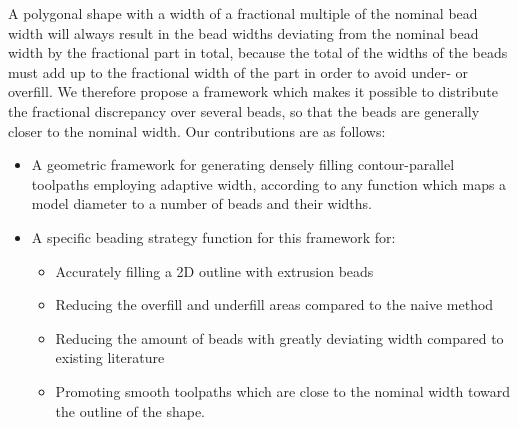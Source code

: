 A polygonal shape with a width of a fractional multiple of the nominal bead width will always result in the bead widths deviating from the nominal bead width by the fractional part in total,
because the total of the widths of the beads must add up to the fractional width of the part in order to avoid under- or overfill.
We therefore propose a framework which makes it possible to distribute the fractional discrepancy over several beads, so that the beads are generally closer to the nominal width.
Our contributions are as follows:
\begin{itemize}
\item A geometric framework for generating densely filling contour-parallel toolpaths employing adaptive width, according to any function which maps a model diameter to a number of beads and their widths.
\item A specific beading strategy function for this framework for:
\begin{itemize}
\item Accurately filling a 2D outline with extrusion beads
\item Reducing the overfill and underfill areas compared to the naive method
\item Reducing the amount of beads with greatly deviating width compared to existing literature
\item Promoting smooth toolpaths which are close to the nominal width toward the outline of the shape.
\end{itemize}
\end{itemize}




